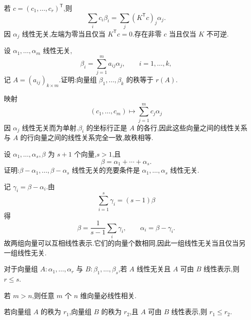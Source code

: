 \begin{solution}
若 $c=(c_1,\ldots,c_r)^{\mathsf T}$,则
\[
 \displaystyle\sum_i c_i\beta_i
 =\sum_j (K^{\mathsf T}c)_j\alpha_j.
\]
因 $\alpha_j$ 线性无关,左端为零当且仅当 $K^{\mathsf T}c=0$.存在非零 $c$ 当且仅当 $K$ 不可逆.
\end{solution}

\begin{example}[\markstar]
设 $\alpha_1,\ldots,\alpha_m$ 线性无关,
\[
 \beta_i=\sum\limits_{j=1}^m a_{ij}\alpha_j,\qquad i=1,\ldots,k,
\]
记 $A=(a_{ij})_{k\times m}$.证明:向量组 $\beta_1,\ldots,\beta_k$ 的秩等于 $r(A)$.
\end{example}
\exampleblank

\begin{solution}
映射
\[
 (c_1,\ldots,c_m)\longmapsto \sum\limits_{j=1}^m c_j\alpha_j
\]
因 $\alpha_j$ 线性无关而为单射.$\beta_i$ 的坐标行正是 $A$ 的各行,因此这些向量之间的线性关系与 $A$ 的行向量之间的线性关系完全一致,故秩相等.
\end{solution}

\begin{example}
设 $\alpha_1,\ldots,\alpha_s,\beta$ 为 $s+1$ 个向量,$s>1$,且
\[
 \beta=\alpha_1+\cdots+\alpha_s.
\]
证明:$\beta-\alpha_1,\ldots,\beta-\alpha_s$ 线性无关的充要条件是 $\alpha_1,\ldots,\alpha_s$ 线性无关.
\end{example}
\exampleblank

\begin{solution}
记 $\gamma_i=\beta-\alpha_i$.由
\[
 \displaystyle\sum\limits_{i=1}^s\gamma_i=(s-1)\beta
\]
得
\[
 \beta=\dfrac{1}{s-1}\sum_i\gamma_i,
 \qquad
 \alpha_i=\beta-\gamma_i.
\]
故两组向量可以互相线性表示.它们的向量个数相同,因此一组线性无关当且仅当另一组线性无关.
\end{solution}

\begin{theorem}[\markstar]
对于向量组 $A:\alpha_1,\ldots,\alpha_r$ 与 $B:\beta_1,\ldots,\beta_s$,若 $A$ 线性无关且 $A$ 可由 $B$ 线性表示,则 $r\leq s$.
\end{theorem}

\begin{corollary}[\markstar]
若 $m>n$,则任意 $m$ 个 $n$ 维向量必线性相关.
\end{corollary}

\begin{theorem}[\markstar]
若向量组 $A$ 的秩为 $r_1$,向量组 $B$ 的秩为 $r_2$,且 $A$ 可由 $B$ 线性表示,则 $r_1\leq r_2$.
\end{theorem}

